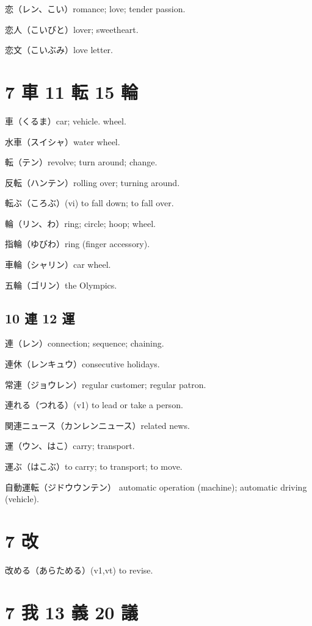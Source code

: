 恋（レン、こい）romance; love; tender passion.

恋人（こいびと）lover; sweetheart.

恋文（こいぶみ）love letter.

\section{7 車 11 転 15 輪}

車（くるま）car; vehicle. wheel.

水車（スイシャ）water wheel.

転（テン）revolve; turn around; change.

反転（ハンテン）rolling over; turning around.

転ぶ（ころぶ）(vi) to fall down; to fall over.

輪（リン、わ）ring; circle; hoop; wheel.

指輪（ゆびわ）ring (finger accessory).

車輪（シャリン）car wheel.

五輪（ゴリン）the Olympics.

\subsection{10 連 12 運}

連（レン）connection; sequence; chaining.

連休（レンキュウ）consecutive holidays.

常連（ジョウレン）regular customer; regular patron.

連れる（つれる）(v1) to lead or take a person.

関連ニュース（カンレンニュース）related news.

運（ウン、はこ）carry; transport.

運ぶ（はこぶ）to carry; to transport; to move.

自動運転（ジドウウンテン）
automatic operation (machine); automatic driving (vehicle).

\section{7 改}

改める（あらためる）(v1,vt) to revise.

\section{7 我 13 義 20 議}


